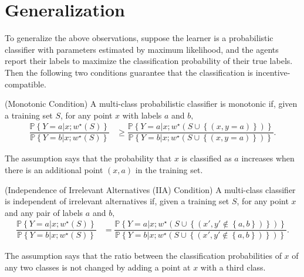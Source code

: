 \documentclass{article}
\begin{document}
\section{Generalization} 

To generalize the above observations, suppose the learner is a probabilistic classifier with parameters estimated by maximum likelihood, and the agents report their labels to maximize the classification probability of their true labels. Then the following two conditions guarantee that the classification is incentive-compatible.
\newline \newline
\begin{df} \label{df:mono} 
(Monotonic Condition) A multi-class probabilistic classifier is monotonic if, given a training set $S $, for any point $x $ with labels $a $ and $b, $
\begin{align*}
\dfrac{\mathbb{P}\left\{Y = a | x ; w^\star \left(S\right)\right\}}{\mathbb{P}\left\{Y = b | x ; w^\star \left(S\right)\right\}} &\geq  \dfrac{\mathbb{P}\left\{Y = a | x ; w^\star \left(S \cup \left\{\left(x, y = a\right)\right\}\right)\right\}}{\mathbb{P}\left\{Y = b | x ; w^\star \left(S \cup \left\{\left(x, y = a\right)\right\}\right)\right\}}.
\end{align*}\end{df}
The assumption says that the probability that $x $ is classified as $a $ increases when there is an additional point $\left(x , a \right)$ in the training set.
\newline \newline
\begin{df} \label{df:iia} 
(Independence of Irrelevant Alternatives (IIA) Condition) A multi-class classifier is independent of irrelevant alternatives if, given a training set $S $, for any point $x $ and any pair of labels $a $ and $b, $
\begin{align*}
\dfrac{\mathbb{P}\left\{Y = a | x ; w^\star \left(S\right)\right\}}{\mathbb{P}\left\{Y = b | x ; w^\star \left(S\right)\right\}} &= \dfrac{\mathbb{P}\left\{Y = a | x ; w^\star \left(S \cup \left\{\left(x', y' \notin \left\{a, b\right\}\right)\right\}\right)\right\}}{\mathbb{P}\left\{Y = b | x ; w^\star \left(S \cup \left\{\left(x', y' \notin \left\{a, b\right\}\right)\right\}\right)\right\}}.
\end{align*}\end{df}
The assumption says that the ratio between the classification probabilities of $x $ of any two classes is not changed by adding a point at $x $ with a third class.
\end{document}
